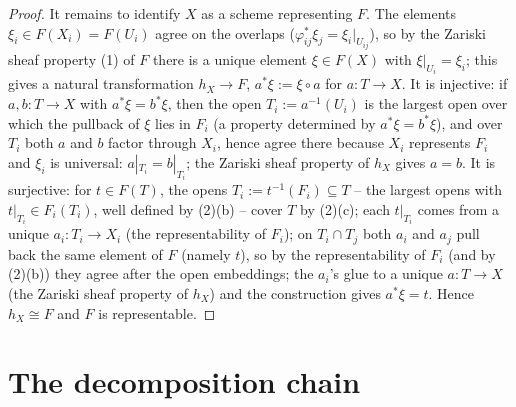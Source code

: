 \begin{proof}
It remains to identify $X$ as a scheme representing $F$.  The
elements $\xi_i\in F(X_i)=F(U_i)$ agree on the overlaps
($\varphi_{ij}^*\xi_j=\xi_i|_{U_{ij}}$), so by the Zariski sheaf
property (1) of $F$ there is a unique element
$\xi\in F(X)$ with $\xi|_{U_i}=\xi_i$; this gives a natural
transformation $h_X\to F$, $a^*\xi:=\xi\circ a$ for $a:T\to X$.  It is
injective: if $a,b:T\to X$ with $a^*\xi=b^*\xi$, then the open
$T_i:=a^{-1}(U_i)$ is the largest open over which the pullback of
$\xi$ lies in $F_i$ (a property determined by
$a^*\xi=b^*\xi$), and over $T_i$ both $a$ and $b$ factor through
$X_i$, hence agree there because $X_i$ represents $F_i$ and
$\xi_i$ is universal: $a|_{T_i}=b|_{T_i}$; the Zariski sheaf property
of $h_X$ gives $a=b$.  It is surjective: for $t\in F(T)$, the opens
$T_i:=t^{-1}(F_i)\subseteq T$ -- the largest opens with
$t|_{T_i}\in F_i(T_i)$, well defined by (2)(b) -- cover $T$ by
(2)(c); each $t|_{T_i}$ comes from a unique $a_i:T_i\to X_i$ (the
representability of $F_i$); on $T_i\cap T_j$ both $a_i$ and $a_j$
pull back the same element of $F$ (namely $t$), so by the
representability of $F_i$ (and by (2)(b)) they agree after the open
embeddings; the $a_i$'s glue to a unique $a:T\to X$ (the Zariski
sheaf property of $h_X$) and the construction gives
$a^*\xi=t$.  Hence $h_X\cong F$ and $F$ is representable.
\end{proof}






\section{The decomposition chain}\label{sec:chain}

